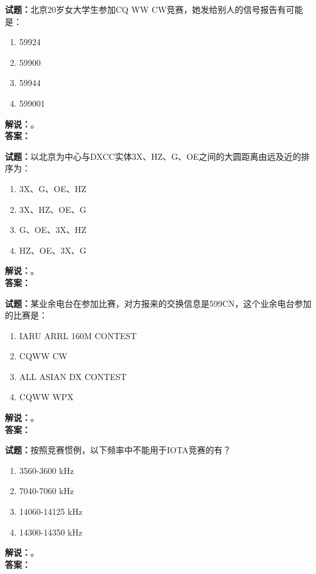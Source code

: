 \documentclass{ctexbook}
\begin{document}
\vspace{\baselineskip}

\noindent\textbf{试题：}北京20岁女大学生参加CQ WW CW竞赛，她发给别人的信号报告有可能是：
\begin{enumerate}[leftmargin=3em]
  \item 59924
  \item 59900
  \item 59944
  \item 599001
\end{enumerate}
\noindent\textbf{解说：}\textbf{}。\\\noindent\textbf{答案：}

\vspace{\baselineskip}

\noindent\textbf{试题：}以北京为中心与DXCC实体3X、HZ、G、OE之间的大圆距离由远及近的排序为：
\begin{enumerate}[leftmargin=3em]
  \item 3X、G、OE、HZ
  \item 3X、HZ、OE、G
  \item G、OE、3X、HZ
  \item HZ、OE、3X、G
\end{enumerate}
\noindent\textbf{解说：}\textbf{}。\\\noindent\textbf{答案：}

\vspace{\baselineskip}

\noindent\textbf{试题：}某业余电台在参加比赛，对方报来的交换信息是599CN，这个业余电台参加的比赛是：
\begin{enumerate}[leftmargin=3em]
  \item IARU ARRL 160M CONTEST
  \item CQWW CW
  \item ALL ASIAN DX CONTEST
  \item CQWW WPX
\end{enumerate}
\noindent\textbf{解说：}\textbf{}。\\\noindent\textbf{答案：}

\vspace{\baselineskip}

\noindent\textbf{试题：}按照竞赛惯例，以下频率中不能用于IOTA竞赛的有？
\begin{enumerate}[leftmargin=3em]
  \item 3560-3600 \unit{\kHz}
  \item 7040-7060 \unit{\kHz}
  \item 14060-14125 \unit{\kHz}
  \item 14300-14350 \unit{\kHz}
\end{enumerate}
\noindent\textbf{解说：}\textbf{}。\\\noindent\textbf{答案：}
\end{document}
